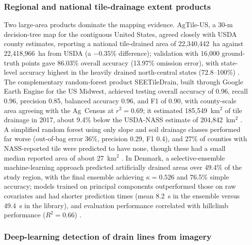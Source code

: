 \documentclass[11pt]{article}
\begin{document}
\subsubsection{Regional and national tile-drainage extent products}

Two large-area products dominate the mapping evidence. AgTile-US, a 30-m
decision-tree map for the contiguous United States, agreed closely with USDA
county estimates, reporting a national tile-drained area of 22{,}340{,}442~ha
against 22{,}418{,}966~ha from USDA (a $-0.35$\% difference); validation with
16{,}000 ground-truth points gave 86.03\% overall accuracy (13.97\% omission
error), with state-level accuracy highest in the heavily drained north-central
states (72.8--100\%) \parencite{Valayamkunnath2020}. The complementary
random-forest product SEETileDrain, built through Google Earth Engine for the US
Midwest, achieved testing overall accuracy of 0.96, recall 0.96, precision 0.85,
balanced accuracy 0.96, and F1 of 0.90, with county-scale area agreeing with the
Ag~Census at $r^2=0.69$; it estimated 185{,}549~km$^2$ of tile drainage in 2017,
about 9.4\% below the USDA-NASS estimate of 204{,}842~km$^2$
\parencite{Wan2024}. A simplified random forest using only slope and soil
drainage classes performed far worse (out-of-bag error 36\%, precision 0.29, F1
0.4), and 27\% of counties with NASS-reported tile were predicted to have none,
though these had a small median reported area of about 27~km$^2$
\parencite{Wan2024}. In Denmark, a selective-ensemble machine-learning approach
predicted artificially drained areas over 49.4\% of the study region, with the
final ensemble achieving $\kappa=0.526$ and 76.5\% simple accuracy; models
trained on principal components outperformed those on raw covariates and had
shorter prediction times (mean 8.2~s in the ensemble versus 49.4~s in the
library), and evaluation performance correlated with hillclimb performance
($R^2=0.66$) \parencite{Moller2018}.

\subsubsection{Deep-learning detection of drain lines from imagery}
\end{document}
